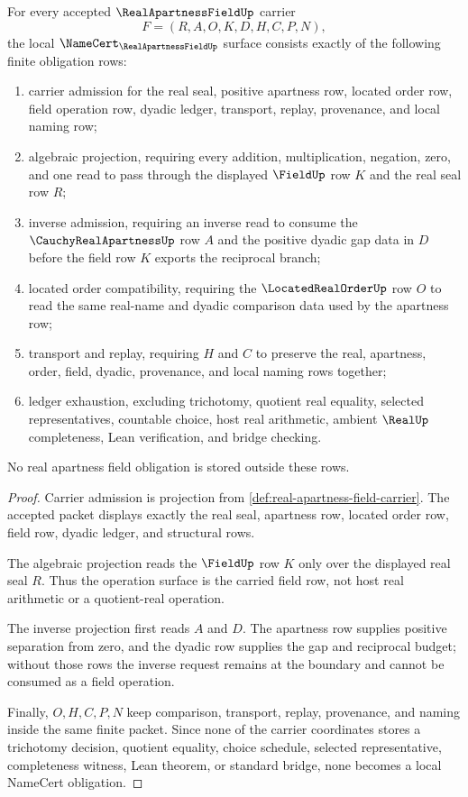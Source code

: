 \begin{theorem}
\label{thm:real-apartness-field-namecert-obligations}
For every accepted $\RealApartnessFieldUp$ carrier
$$
F=(R,A,O,K,D,H,C,P,N),
$$
the local $\NameCert_{\RealApartnessFieldUp}$ surface consists exactly of the following finite obligation rows:
\begin{enumerate}
\item carrier admission for the real seal, positive apartness row, located order row, field operation row, dyadic ledger, transport, replay, provenance, and local naming row;
\item algebraic projection, requiring every addition, multiplication, negation, zero, and one read to pass through the displayed $\FieldUp$ row $K$ and the real seal row $R$;
\item inverse admission, requiring an inverse read to consume the $\CauchyRealApartnessUp$ row $A$ and the positive dyadic gap data in $D$ before the field row $K$ exports the reciprocal branch;
\item located order compatibility, requiring the $\LocatedRealOrderUp$ row $O$ to read the same real-name and dyadic comparison data used by the apartness row;
\item transport and replay, requiring $H$ and $C$ to preserve the real, apartness, order, field, dyadic, provenance, and local naming rows together;
\item ledger exhaustion, excluding trichotomy, quotient real equality, selected representatives, countable choice, host real arithmetic, ambient $\RealUp$ completeness, Lean verification, and bridge checking.
\end{enumerate}
No real apartness field obligation is stored outside these rows.
\end{theorem}
\begin{proof}
Carrier admission is projection from \autoref{def:real-apartness-field-carrier}. The accepted packet displays exactly the real seal, apartness row, located order row, field row, dyadic ledger, and structural rows.

The algebraic projection reads the $\FieldUp$ row $K$ only over the displayed real seal $R$. Thus the operation surface is the carried field row, not host real arithmetic or a quotient-real operation.

The inverse projection first reads $A$ and $D$. The apartness row supplies positive separation from zero, and the dyadic row supplies the gap and reciprocal budget; without those rows the inverse request remains at the boundary and cannot be consumed as a field operation.

Finally, $O,H,C,P,N$ keep comparison, transport, replay, provenance, and naming inside the same finite packet. Since none of the carrier coordinates stores a trichotomy decision, quotient equality, choice schedule, selected representative, completeness witness, Lean theorem, or standard bridge, none becomes a local NameCert obligation.
\end{proof}

